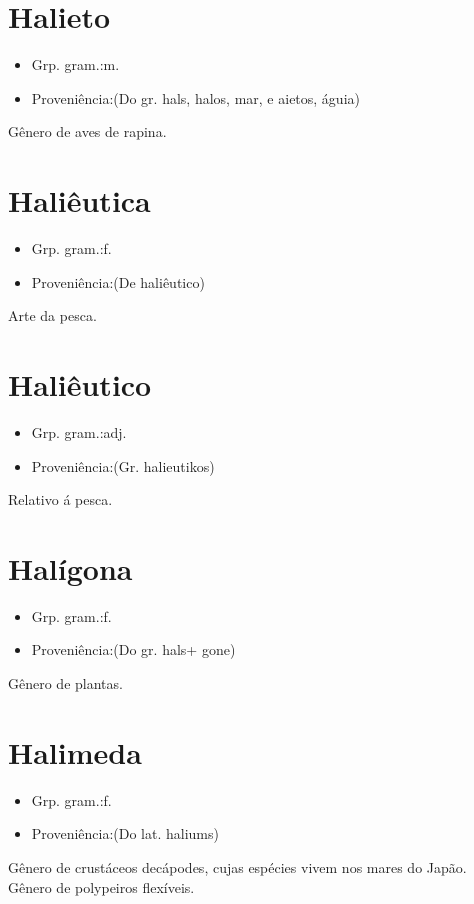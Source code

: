 \documentclass{article}
\begin{document}
\section{Halieto}
\begin{itemize}
\item {Grp. gram.:m.}
\end{itemize}
\begin{itemize}
\item {Proveniência:(Do gr. \textunderscore hals\textunderscore , \textunderscore halos\textunderscore , mar, e \textunderscore aietos\textunderscore , águia)}
\end{itemize}
Gênero de aves de rapina.
\section{Haliêutica}
\begin{itemize}
\item {Grp. gram.:f.}
\end{itemize}
\begin{itemize}
\item {Proveniência:(De \textunderscore haliêutico\textunderscore )}
\end{itemize}
Arte da pesca.
\section{Haliêutico}
\begin{itemize}
\item {Grp. gram.:adj.}
\end{itemize}
\begin{itemize}
\item {Proveniência:(Gr. \textunderscore halieutikos\textunderscore )}
\end{itemize}
Relativo á pesca.
\section{Halígona}
\begin{itemize}
\item {Grp. gram.:f.}
\end{itemize}
\begin{itemize}
\item {Proveniência:(Do gr. \textunderscore hals\textunderscore  + \textunderscore gone\textunderscore )}
\end{itemize}
Gênero de plantas.
\section{Halimeda}
\begin{itemize}
\item {Grp. gram.:f.}
\end{itemize}
\begin{itemize}
\item {Proveniência:(Do lat. \textunderscore haliums\textunderscore )}
\end{itemize}
Gênero de crustáceos decápodes, cujas espécies vivem nos mares do Japão.
Gênero de polypeiros flexíveis.
\end{document}
